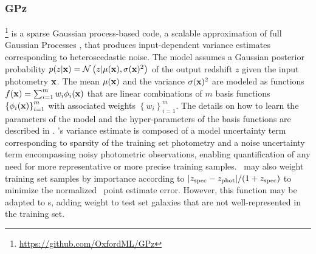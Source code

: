%
%

\subsubsection{GPz}

\gpz \footnote{\url{https://github.com/OxfordML/GPz}} \citep{almosallam_gpz:_2016, almosallam_sparse_2016} is a sparse Gaussian process-based code, a scalable approximation of full Gaussian Processes \citep{rasmussen_gaussian_2006}, that produces input-dependent variance estimates corresponding to heteroscedastic noise.
The model assumes a Gaussian posterior probability $p(z \vert {\mathbf{x}}) = \mathcal{N}\left(z \vert \mu({\mathbf{x}}), \sigma({\mathbf{x}})^{2}\right)$ of the output redshift $z$ given the input photometry ${\mathbf{x}}$.
The mean $\mu({\mathbf{x}})$ and the variance $\sigma({\mathbf{x}})^{2}$ are modeled as functions $f({\mathbf{x}}) = \sum_{i=1}^{m}w_{i}\phi_{i}({\mathbf{x}})$ that are linear combinations of $m$ basis functions $\left\{\phi_{i}({\mathbf{x}})\right\}_{i=1}^{m}$ with associated weights $\left\{w_{i}\right\}_{i=1}^{m}$.
The details on how to learn the parameters of the model and the hyper-parameters of the basis functions are described in \citet{almosallam_gpz:_2016}.
\gpz's variance estimate is composed of a model uncertainty term corresponding to sparsity of the training set photometry and a noise uncertainty term encompassing noisy photometric observations, enabling quantification of any need for more representative or more precise training samples.
\gpz\ may also weight training set samples by importance according to $|z_{\rm{spec}} - z_{\rm{phot}}| / (1+z_{\rm{spec}})$ to minimize the normalized \pz\ point estimate error.  However, this function may be adapted to \pzpdf s, adding weight to test set galaxies that are not well-represented in the training set.

